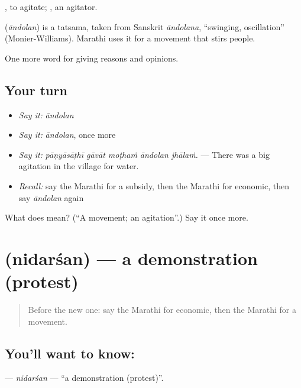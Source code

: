  , to agitate; , an agitator.

\begin{cousinweb}
\textbf{} (\emph{āndolan}) is a tatsama, taken from Sanskrit \emph{āndolana}, \textquotedblleft{}swinging, oscillation\textquotedblright{} (Monier-Williams). Marathi uses it for a movement that stirs people.
\end{cousinweb}

\begin{grammarlens}[title={What you've built}]
One more word for giving reasons and opinions.
\end{grammarlens}

\subsection*{Your turn}
\begin{itemize}
\raggedright
  \item \emph{Say it:} \emph{āndolan}
  \item \emph{Say it:} \emph{āndolan}, once more
  \item \emph{Say it:} \emph{pāṇyāsāṭhī gāvāt moṭhaṁ āndolan jhālaṁ.} — There was a big agitation in the village for water.
  \item \emph{Recall:} say the Marathi for a subsidy, then the Marathi for economic, then say \emph{āndolan} again
\end{itemize}

\begin{tcolorbox}[breakable,colback=teal!4,colframe=teal!35!black,title={Before you move on}]
What does  mean? (\textquotedblleft{}A movement; an agitation\textquotedblright{}.) Say it once more.
\end{tcolorbox}
\section[\texorpdfstring{\mr{निदर्शन} (nidarśan)}{निदर्शन (nidarśan)}]{ (nidarśan) — a demonstration (protest)}

\label{lesson:MR-C362-nidarsan}



\begin{quote}
Before the new one: say the Marathi for economic, then the Marathi for a movement.
\end{quote}

\subsection*{You'll want to know: }
\textbf{} — \emph{nidarśan} — \textquotedblleft{}a demonstration (protest)\textquotedblright{}.

